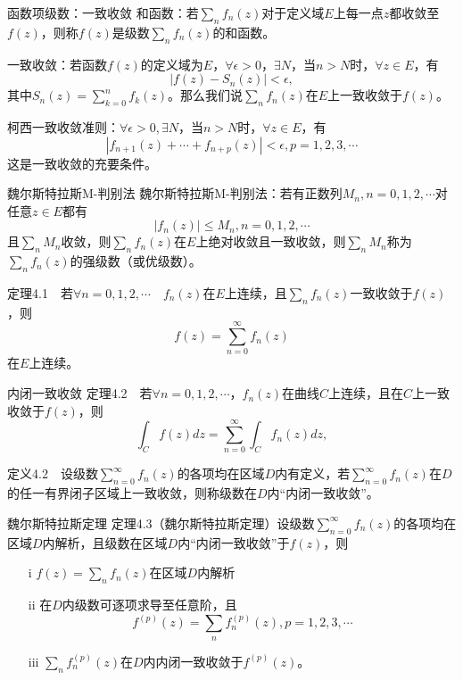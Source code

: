 \documentclass[11pt]{beamer}
\newcommand{\kong}[1][0.5]{\vspace{#1cm}}
\begin{document}
\begin{frame}{函数项级数：一致收敛}
和函数：若$\sum_n f_n (z)$对于定义域$E$上每一点$z$都收敛至$f(z)$，则称$f(z)$是级数$\sum_n f_n (z)$的和函数。

\kong[0.5]
一致收敛：若函数$f(z)$的定义域为$E$，$\forall \epsilon >0$，$\exists N$，当$n>N$时，$\forall z \in E$，有
\begin{equation}
| f(z) - S_n (z) | < \epsilon,
\end{equation}
其中$S_n(z) = \sum^n_{k=0} f_k (z)$。那么我们说$\sum_n f_n(z)$在$E$上{\color{blue}一致收敛}于$f(z)$。

\kong[0.5]
柯西一致收敛准则：$\forall \epsilon >0, \exists N$，当$n>N$时，$\forall z \in E$，有
\begin{equation}
| f_{n+1}(z) + \cdots + f_{n+p}(z) | < \epsilon, p=1,2,3,\cdots
\end{equation}
这是一致收敛的充要条件。
\end{frame}

\begin{frame}{魏尔斯特拉斯M-判别法}
魏尔斯特拉斯M-判别法：若有正数列$M_n, n=0,1,2,\cdots$对任意$z \in E$都有
\begin{equation}
| f_n (z) | \leq M_n, n=0,1,2,\cdots
\end{equation}
且$\sum_n M_n$收敛，则$\sum_n f_n(z)$在$E$上绝对收敛且一致收敛，则$\sum_n M_n$称为$\sum_n f_n(z)$的强级数（或优级数）。

\kong[1]
定理4.1　若$\forall n = 0,1,2,\cdots$　$f_n(z)$在$E$上连续，且$\sum_n f_n(z)$一致收敛于$f(z)$，则
\begin{equation}
f(z) = \sum_{n=0}^{\infty} f_n (z)
\end{equation}
在$E$上连续。
\end{frame}

\begin{frame}{内闭一致收敛}
定理4.2　若$\forall n = 0,1,2,\cdots$，$f_n(z)$在曲线$C$上连续，且在$C$上一致收敛于$f(z)$，则
\begin{equation}
\int_C f(z) dz = \sum_{n=0}^{\infty} \int_C f_n(z) dz,
\end{equation}

\kong[1]
定义4.2　设级数$\sum_{n=0}^{\infty} f_n(z)$的各项均在区域$D$内有定义，若$\sum_{n=0}^{\infty} f_n(z)$在$D$的任一有界闭子区域上一致收敛，则称级数在$D$内“内闭一致收敛”。
\end{frame}

\begin{frame}{魏尔斯特拉斯定理}
定理4.3（魏尔斯特拉斯定理）设级数$\sum_{n=0}^{\infty} f_n (z)$的各项均在区域$D$内解析，且级数在区域$D$内“内闭一致收敛”于$f(z)$，则
\begin{itemize}
	\item [i] $f(z) = \sum_n f_n(z)$在区域$D$内解析
	\item [ii] 在$D$内级数可逐项求导至任意阶，且
	\begin{equation}
	f^{(p)} (z) = \sum_n f^{(p)}_n (z), p=1,2,3,\cdots
	\end{equation}
	\item [iii] $\sum_n f^{(p)}_n (z)$在$D$内内闭一致收敛于$f^{(p)}(z)$。
\end{itemize}
\end{frame}
\end{document}

